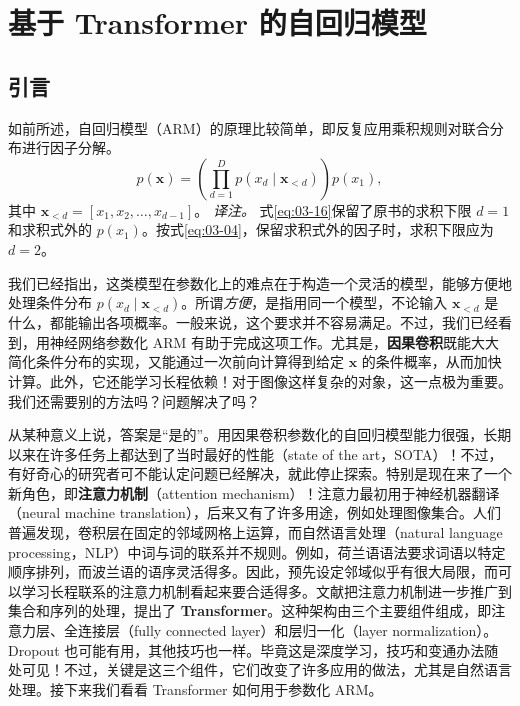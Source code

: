 \section{基于 Transformer 的自回归模型}
\subsection{引言}

如前所述，自回归模型（ARM）的原理比较简单，即反复应用乘积规则对联合分布进行因子分解。
\begin{equation}
p(\mathbf{x})=\left(\prod_{d=1}^D p(x_d\mid\mathbf{x}_{<d})\right)p(x_1),
\tag{3.16}\label{eq:03-16}
\end{equation}
其中 $\mathbf{x}_{<d}=[x_1,x_2,\ldots,x_{d-1}]$。
\emph{译注。} 式\eqref{eq:03-16}保留了原书的求积下限 $d=1$ 和求积式外的 $p(x_1)$。按式\eqref{eq:03-04}，保留求积式外的因子时，求积下限应为 $d=2$。

我们已经指出，这类模型在参数化上的难点在于构造一个灵活的模型，能够方便地处理条件分布 $p(x_d\mid\mathbf{x}_{<d})$。所谓\emph{方便}，是指用同一个模型，不论输入 $\mathbf{x}_{<d}$ 是什么，都能输出各项概率。一般来说，这个要求并不容易满足。不过，我们已经看到，用神经网络参数化 ARM 有助于完成这项工作。尤其是，\textbf{因果卷积}既能大大简化条件分布的实现，又能通过一次前向计算得到给定 $\mathbf{x}$ 的条件概率，从而加快计算。此外，它还能学习长程依赖！对于图像这样复杂的对象，这一点极为重要。我们还需要别的方法吗？问题解决了吗？

从某种意义上说，答案是“是的”。用因果卷积参数化的自回归模型能力很强，长期以来在许多任务上都达到了当时最好的性能（state of the art，SOTA）！不过，有好奇心的研究者可不能认定问题已经解决，就此停止探索。特别是现在来了一个新角色，即\textbf{注意力机制}（attention mechanism）！注意力最初用于神经机器翻译（neural machine translation），后来又有了许多用途，例如处理图像集合。人们普遍发现，卷积层在固定的邻域网格上运算，而自然语言处理（natural language processing，NLP）中词与词的联系并不规则。例如，荷兰语语法要求词语以特定顺序排列，而波兰语的语序灵活得多。因此，预先设定邻域似乎有很大局限，而可以学习长程联系的注意力机制看起来要合适得多。文献把注意力机制进一步推广到集合和序列的处理，提出了 \textbf{Transformer}。这种架构由三个主要组件组成，即注意力层、全连接层（fully connected layer）和层归一化（layer normalization）。Dropout 也可能有用，其他技巧也一样。毕竟这是深度学习，技巧和变通办法随处可见！不过，关键是这三个组件，它们改变了许多应用的做法，尤其是自然语言处理。接下来我们看看 Transformer 如何用于参数化 ARM。

